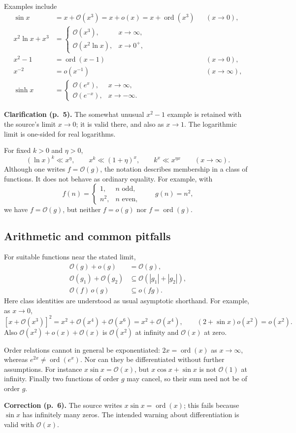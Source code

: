\documentclass[11pt,a4paper]{article}
\newcommand{\OO}{\mathcal O}
\DeclareMathOperator{\ord}{ord}
\newcommand{\src}[1]{\par\smallskip{\small\color{gray}Source PDF: page(s) #1.}\par}
\newcommand{\edit}[2]{\par\begingroup\small\color{blue!55!black}\textbf{#1.} #2\par\endgroup}
\numberwithin{equation}{section}
\begin{document}
Examples include
\begin{align*}
 \sin x&=x+\OO(x^3)=x+o(x)=x+\ord(x^3) &&(x\to0),\\
 x^2\ln x+x^3&=\begin{cases}\OO(x^3),&x\to\infty,\\
 \OO(x^2\ln x),&x\to0^+,\end{cases}\\
 x^2-1&=\ord(x-1)&&(x\to0),\\
 x^{-2}&=o(x^{-1})&&(x\to\infty),\\
 \sinh x&=\begin{cases}\OO(e^x),&x\to\infty,\\
 \OO(e^{-x}),&x\to-\infty.\end{cases}
\end{align*}
\edit{Clarification (p.~5)}{The somewhat unusual $x^2-1$ example is
retained with the source's limit $x\to0$; it is valid there, and also
as $x\to1$. The logarithmic limit is one-sided for real logarithms.}
For fixed $k>0$ and $\eta>0$,
\[
 (\ln x)^k\ll x^\eta,\qquad x^k\ll(1+\eta)^x,
 \qquad k^x\ll x^{\eta x}\qquad(x\to\infty).
\]
Although one writes $f=\OO(g)$, the notation describes membership
in a class of functions. It does not behave as ordinary equality.
For example, with
\[
 f(n)=\begin{cases}1,&n\text{ odd},\\n^2,&n\text{ even},\end{cases}
 \qquad g(n)=n^2,
\]
we have $f=\OO(g)$, but neither $f=o(g)$ nor $f=\ord(g)$.

\subsection{Arithmetic and common pitfalls}
\src{5--6}
For suitable functions near the stated limit,
\begin{align*}
 \OO(g)+o(g)&=\OO(g),\\
 \OO(g_1)+\OO(g_2)&\subseteq\OO(|g_1|+|g_2|),\\
 \OO(f)\,o(g)&\subseteq o(fg).
\end{align*}
Here class identities are understood as usual asymptotic shorthand.
For example, as $x\to0$,
\[
 [x+\OO(x^3)]^2=x^2+\OO(x^4)+\OO(x^6)=x^2+\OO(x^4),
 \qquad (2+\sin x)o(x^2)=o(x^2).
\]
Also $\OO(x^2)+o(x)+\OO(x)$ is $\OO(x^2)$ at infinity and
$\OO(x)$ at zero.

Order relations cannot in general be exponentiated:
$2x=\ord(x)$ as $x\to\infty$, whereas
$e^{2x}\ne\ord(e^x)$. Nor can they be differentiated without further
assumptions. For instance $x\sin x=\OO(x)$, but
$x\cos x+\sin x$ is not $\OO(1)$ at infinity.
Finally two functions of order $g$ may cancel, so their sum need not
be of order $g$.
\edit{Correction (p.~6)}{The source writes $x\sin x=\ord(x)$;
this fails because $\sin x$ has infinitely many zeros. The intended
warning about differentiation is valid with $\OO(x)$.}
\end{document}
